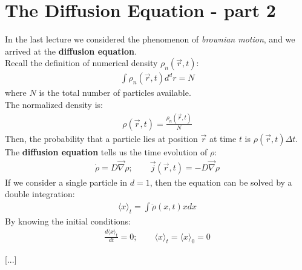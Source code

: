 \documentclass[../template.tex]{subfiles}
\begin{document}
\section{The Diffusion Equation - part 2}

In the last lecture we considered the phenomenon of \textit{brownian motion}, and we arrived 
at the \textbf{diffusion equation}.\\
Recall the definition of numerical density $\rho_n(\vec{r},t)$:
\begin{align*}
    \int \rho_n(\vec{r},t) d^d r = N
\end{align*}
where $N$ is the total number of particles available.\\
The normalized density is:
\begin{align*}
    \rho(\vec{r},t) = \frac{\rho_n(\vec{r},t)}{N}
\end{align*}
Then, the probability that a particle lies at position $\vec{r}$ at time $t$ is $\rho(\vec{r},t)\Delta t$.\\
The \textbf{diffusion equation} tells us the time evolution of $\rho$:
\begin{align*}
    \dot{\rho} = D \vec{\nabla} \rho; \qquad \vec{j}(\vec{r},t) = -D \vec{\nabla} \rho
\end{align*}  
If we consider a single particle in $d=1$, then the equation can be solved by a double integration:
\begin{align*}
    \langle x \rangle_t = \int \ddot{\rho}(x,t) x dx
\end{align*}
By knowing the initial conditions:
\begin{align*}
    \frac{d\langle x \rangle_t}{dt} = 0; \qquad \langle x\rangle_t = \langle x \rangle_0 = 0
\end{align*}

[...]
\end{document}
